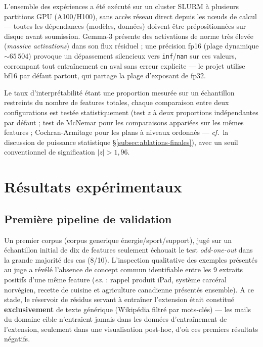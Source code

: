 \documentclass[11pt]{article}
\begin{document}
L'ensemble des expériences a été exécuté sur un cluster SLURM à plusieurs
partitions GPU (A100/H100), sans accès réseau direct depuis les nœuds de
calcul --- toutes les dépendances (modèles, données) doivent être
prépositionnées sur disque avant soumission. Gemma-3 présente des activations
de norme très élevée (\emph{massive activations}) dans son flux résiduel ; une
précision fp16 (plage dynamique $\sim 65\,504$) provoque un dépassement
silencieux vers \texttt{inf}/\texttt{nan} sur ces valeurs, corrompant tout
entraînement en aval sans erreur explicite --- le projet utilise bf16 par
défaut partout, qui partage la plage d'exposant de fp32.

Le taux d'interprétabilité étant une proportion mesurée sur un échantillon restreints du nombre de features totales, chaque comparaison entre deux configurations est testée
statistiquement (test $z$ à deux proportions indépendantes par défaut ; test de
McNemar pour les comparaisons appariées sur les mêmes features ;
Cochran-Armitage pour les plans à niveaux ordonnés --- \emph{cf.}~la
discussion de puissance statistique \S\ref{subsec:ablations-finales}), avec
un seuil conventionnel de signification $|z| > 1{,}96$.

\newpage
\section{Résultats expérimentaux}
\label{sec:resultats}

\subsection{Première pipeline de validation}
\label{subsec:diagnostic-initial}

Un premier corpus (corpus generique énergie/sport/support), jugé sur un échantillon initial de dix de
features seulement échouait le test \emph{odd-one-out} dans la grande majorité des cas (8/10).
L'inspection qualitative des exemples présentés au juge a révélé l'absence de
concept commun identifiable entre les 9 extraits
positifs d'une même feature (\emph{ex.} : rappel produit iPad, système
carcéral norvégien, recette de cuisine et agriculture canadienne présentés
ensemble). A ce stade, le réservoir de résidus servant à entraîner l'extension était
constitué \textbf{exclusivement} de texte générique (Wikipédia filtré par
mots-clés) --- les mails du domaine cible n'entraient jamais dans les données
d'entraînement de l'extension, seulement dans une visualisation post-hoc, d'où ces premiers résultats négatifs.
\end{document}
